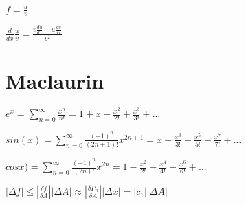 \documentclass[12pt,a4paper]{article}
\begin{document}
$f = \frac{u}{v} $

$\frac{d}{dx}\frac{u}{v} = \frac{v\frac{du}{dx}-u\frac{dv}{dx}}{v^2}$

\section{Maclaurin}

$ e^x = \sum_{n=0}^{\infty} \frac{x^n}{n!} = 1 + x + \frac{x^2}{2!} + \frac{x^3}{3!} + \ldots $

$ sin(x) = \sum_{n=0}^{\infty} \frac{(-1)^n}{(2n+1)!} x^{2n+1} = x - \frac{x^3}{3!} + \frac{x^5}{5!} - \frac{x^7}{7!} + \ldots$

$ cosx) = \sum_{n=0}^{\infty} \frac{(-1)^n}{(2n)!} x^{2n} = 1 - \frac{x^2}{2!} + \frac{x^4}{4!} - \frac{x^6}{6!} + \ldots$

$|\Delta f| \leq |\frac{\delta f}{\delta A}| |\Delta A| \approx |\frac{\delta P_n}{\delta A}| |\Delta x| = |c_1||\Delta A|$ 
\end{document}

